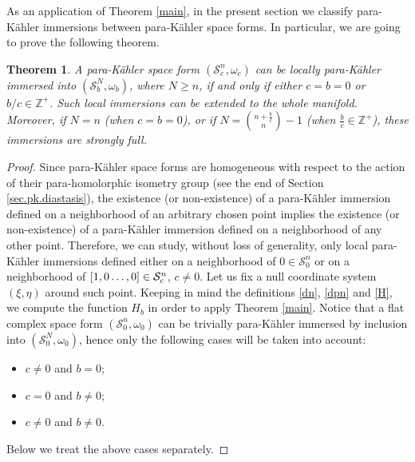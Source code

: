 \documentclass{article}
\newtheorem{thm}{Theorem}
\newcommand{\s}{\mathcal{S}}
\newcommand{\pk}{para-K\"ahler }
\newcommand{\Z}{\mathds{Z}}
\begin{document}
As an application of Theorem \ref{main}, in the present section we classify  \pk immersions between \pk space forms. In particular, we are going to prove the following theorem. 
\begin{thm}
A \pk space form $(\s_c^n,\omega_c)$ can be locally \pk immersed into $(\s_b^N,\omega_b)$, where $N\geq n$, if and only if either $c=b=0$ or $b/c\in\Z^+$. Such local immersions can be extended to the whole manifold. Moreover, if
$N=n$ (when $c=b=0$), or if $N =\binom{n+\frac{b}{c}}{n}-1$ (when $\frac{b}{c}\in\Z^+$), these immersions are strongly full.
\end{thm}
\begin{proof}

Since \pk space forms are homogeneous with respect to the action of their para-homolorphic isometry group (see the end of Section \ref{sec.pk.diastasis}), the existence (or non-existence) of  a \pk immersion defined on a neighborhood of an arbitrary chosen point implies the existence (or non-existence) of a \pk immersion defined on a neighborhood of any other point. Therefore, we can study, without loss of generality, only local \pk immersions defined either on a neighborhood of  $0\in \s_0^n$ or on a neighborhood of  $[1,0\mathellipsis,0]\in\s^n_c$, $c\neq 0$. Let us fix a null coordinate system $(\xi,\eta)$ around such point. Keeping in mind the definitions \eqref{dn}, \eqref{dpn} and \eqref{H},
we compute the function $H_b$ in order to apply Theorem \ref{main}.
Notice that a flat complex space form $(\s_0^n,\omega_0)$ can be trivially \pk immersed by inclusion into $(\s_0^N,\omega_0)$, hence only the following cases will be taken into account:
\begin{itemize} 
\item $c\neq 0$ and $b= 0$;
\item $c= 0$ and $b\neq 0$;
\item $c\neq 0$ and $b\neq 0$.
\end{itemize} 
Below we treat the above cases separately.



\end{proof}
\end{document}
